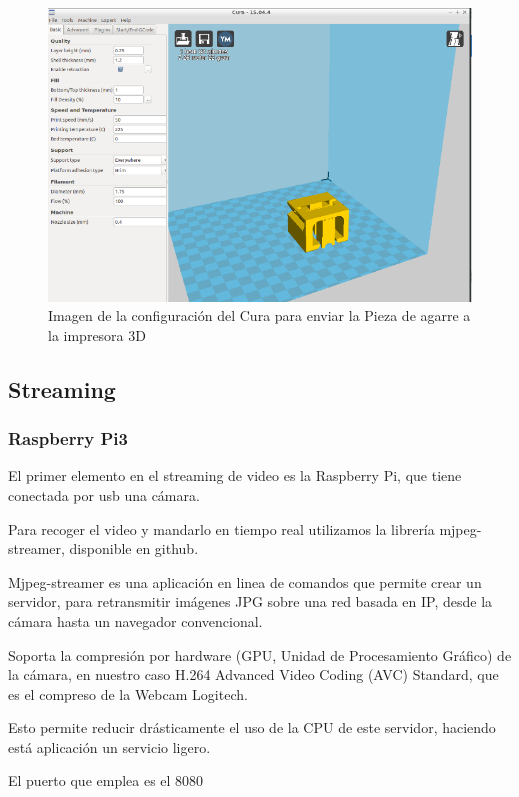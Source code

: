 \documentclass[twoside, 12pt]{epstfg}
\begin{document}
\begin{figure}[h]
	\centerline{
		\mbox{\includegraphics[width=.75\textwidth]{images/Cura2.png}}
	}
	\caption{Imagen de la configuración del Cura para enviar la Pieza de agarre a la impresora 3D}
\end{figure}
 
\newpage
\subsection{Streaming}
\subsubsection{Raspberry Pi3}
El primer elemento en el streaming de video es la Raspberry Pi, que tiene conectada por usb una cámara.

Para recoger el video y mandarlo en tiempo real utilizamos la librería mjpeg-streamer, disponible en github.

Mjpeg-streamer es una aplicación en linea de comandos que permite crear un servidor, para retransmitir imágenes JPG sobre una red basada en IP, desde la cámara hasta un navegador convencional.

Soporta la compresión por hardware (GPU, Unidad de Procesamiento Gráfico) de la cámara, en nuestro caso H.264 Advanced Video Coding (AVC) Standard, que es el compreso de la Webcam Logitech.

Esto permite reducir drásticamente el uso de la CPU de este servidor, haciendo está aplicación un servicio ligero.

El puerto que emplea es el 8080
\end{document}
